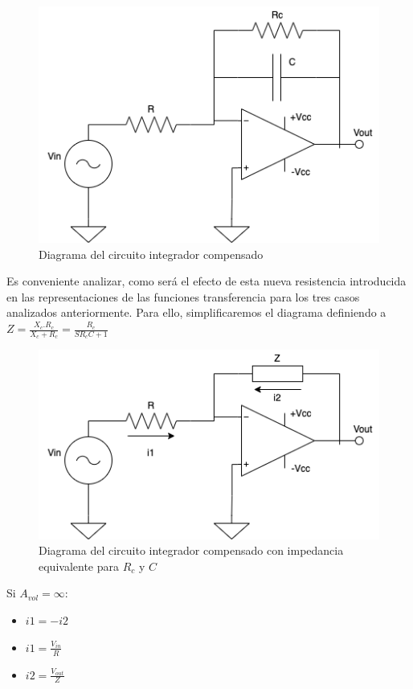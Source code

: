 \begin{figure}[H]
    \centering 
    \includegraphics [scale=0.6] {../Ejercicio3-CircuitoIntegradoresyDerivadores/Imagenes/diagrama-integrador-compensado.png} 
    \caption{Diagrama del circuito integrador compensado}
    \label{fig:emptyPlotTool}
\end{figure}

Es conveniente analizar, como será el efecto de esta nueva resistencia introducida en las representaciones de las funciones transferencia para los tres
casos analizados anteriormente. Para ello, simplificaremos el diagrama definiendo a $Z=\frac{X_c.R_c}{X_c+R_c}=\frac{R_c}{SR_cC+1}$

\begin{figure}[H]
    \centering 
    \includegraphics [scale=0.6] {../Ejercicio3-CircuitoIntegradoresyDerivadores/Imagenes/diagrama-integrador-compensado-resumido.png} 
    \caption{Diagrama del circuito integrador compensado con impedancia equivalente para $R_c$ y $C$}
    \label{fig:emptyPlotTool}
\end{figure}

Si $A_{vol} = \infty$:

\begin{itemize}
	\item $i1 = -i2$
	\item $i1 = \frac{V_{in}}{R} $
	\item $i2 = \frac{V_{out}}{Z}$
\end{itemize}

